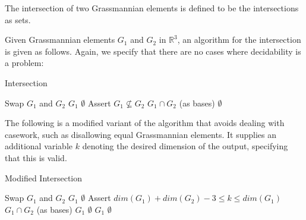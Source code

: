\documentclass[12pt]{article}
\newcommand{\R}{\mathbb{R}}
\newenvironment{definition}[2][Definition]{\begin{trivlist}
\item[\hskip \labelsep {\bfseries #1}\hskip \labelsep {\bfseries #2.}]}{\end{trivlist}}
\newenvironment{proposition}[2][Proposition]{\begin{trivlist}
\item[\hskip \labelsep {\bfseries #1}\hskip \labelsep {\bfseries #2.}]}{\end{trivlist}}
\begin{document}
\begin{definition}{3.1}
The intersection of two Grassmannian elements is defined to be the intersections as sets.
\end{definition}

\begin{proposition}{3.2}
Given Grassmannian elements \(G_1\) and \(G_2\) in \(\R^3\), an algorithm for the intersection is given as follows. Again, we specify that there are no cases where decidability is a problem:

\begin{algorithm}[H]
\caption{Intersection}
\begin{algorithmic}[3]
\State Swap $G_1$ and $G_2$
\EndIf
{}
\Return $G_1$
\Return $\emptyset$
\EndIf
\State Assert $G_1 \not\subseteq G_2$
\Return $G_1 \cap G_2$ (as bases)
\Return $\emptyset$
\Else{
\Return $\emptyset$
}
\EndIf
\EndProcedure
\end{algorithmic}
\end{algorithm}

\end{proposition}

\begin{proposition}{3.3}
The following is a modified variant of the algorithm that avoids dealing with casework, such as disallowing equal Grassmannian elements. It supplies an additional variable \(k\) denoting the desired dimension of the output, specifying that this is valid.

\begin{algorithm}[H]
\caption{Modified Intersection}
\begin{algorithmic}[4]
\State Swap $G_1$ and $G_2$
\EndIf
{}
\Return $G_1$
\Return $\emptyset$
\EndIf
\State Assert $dim(G_1) + dim(G_2) - 3 \leq k \leq dim(G_1)$
\Return $G_1 \cap G_2$ (as bases)
\Return $G_1$
\Return $\emptyset$
\Return $G_1$
\Return $\emptyset$
\EndIf
\EndProcedure
\end{algorithmic}
\end{algorithm}

\end{proposition}
\end{document}
